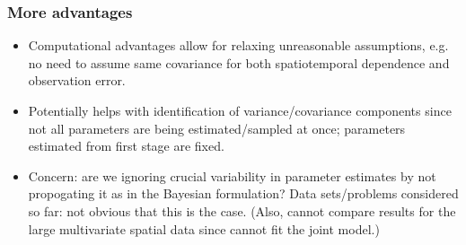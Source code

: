 \documentclass{beamer}
\begin{document}
\begin{frame}
  \frametitle{More advantages}
  \begin{itemize}  
  \item Computational advantages allow for relaxing unreasonable
    assumptions, e.g. no need to assume same covariance for
    both spatiotemporal dependence and observation error.
  \item Potentially helps with identification of variance/covariance
    components since not all parameters are being estimated/sampled at once;
    parameters estimated from first stage are fixed.
  \item Concern: are we ignoring crucial variability in parameter
    estimates by not propogating it as in the Bayesian formulation?
    Data sets/problems considered so far: not obvious that this is the
    case. (Also, cannot compare results for the large multivariate spatial
    data since cannot fit the joint model.)
  \end{itemize}
\end{frame}
\end{document}
